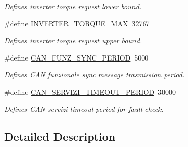 \begin{DoxyCompactItemize}
\begin{DoxyCompactList}\small\item\em Defines inverter torque request lower bound. \end{DoxyCompactList}\item 
\mbox{\label{group___common__defines__group_ga72d863a60f837177f8e2d72da9b9f6b8}} 
\#define \mbox{\hyperlink{group___common__defines__group_ga72d863a60f837177f8e2d72da9b9f6b8}{I\+N\+V\+E\+R\+T\+E\+R\+\_\+\+T\+O\+R\+Q\+U\+E\+\_\+\+M\+AX}}~32767
\begin{DoxyCompactList}\small\item\em Defines inverter torque request upper bound. \end{DoxyCompactList}\item 
\mbox{\label{group___common__defines__group_ga141aed1ea96be5f08ec65951b9b29592}} 
\#define \mbox{\hyperlink{group___common__defines__group_ga141aed1ea96be5f08ec65951b9b29592}{C\+A\+N\+\_\+\+F\+U\+N\+Z\+\_\+\+S\+Y\+N\+C\+\_\+\+P\+E\+R\+I\+OD}}~5000
\begin{DoxyCompactList}\small\item\em Defines C\+AN funzionale sync message trasmission period. \end{DoxyCompactList}\item 
\mbox{\label{group___common__defines__group_ga203445f69e05597667dd8d4f43451ffc}} 
\#define \mbox{\hyperlink{group___common__defines__group_ga203445f69e05597667dd8d4f43451ffc}{C\+A\+N\+\_\+\+S\+E\+R\+V\+I\+Z\+I\+\_\+\+T\+I\+M\+E\+O\+U\+T\+\_\+\+P\+E\+R\+I\+OD}}~30000
\begin{DoxyCompactList}\small\item\em Defines C\+AN servizi timeout period for fault check. \end{DoxyCompactList}\end{DoxyCompactItemize}


\subsection{Detailed Description}
